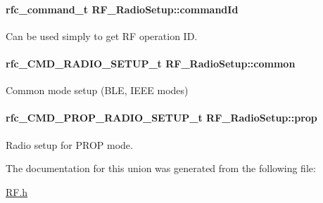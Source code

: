 \paragraph[{command\+Id}]{\setlength{\rightskip}{0pt plus 5cm}rfc\+\_\+command\+\_\+t R\+F\+\_\+\+Radio\+Setup\+::command\+Id}\label{union_r_f___radio_setup_a7849a5bb5dc28c798cc55793f6c347dd}


Can be used simply to get R\+F operation I\+D. 

\paragraph[{common}]{\setlength{\rightskip}{0pt plus 5cm}rfc\+\_\+\+C\+M\+D\+\_\+\+R\+A\+D\+I\+O\+\_\+\+S\+E\+T\+U\+P\+\_\+t R\+F\+\_\+\+Radio\+Setup\+::common}\label{union_r_f___radio_setup_afd03d9690df15d5cca3e82c4ff25ba58}


Common mode setup (B\+L\+E, I\+E\+E\+E modes) 

\paragraph[{prop}]{\setlength{\rightskip}{0pt plus 5cm}rfc\+\_\+\+C\+M\+D\+\_\+\+P\+R\+O\+P\+\_\+\+R\+A\+D\+I\+O\+\_\+\+S\+E\+T\+U\+P\+\_\+t R\+F\+\_\+\+Radio\+Setup\+::prop}\label{union_r_f___radio_setup_afd693ac0735adf77800aa285124bd03a}


Radio setup for P\+R\+O\+P mode. 



The documentation for this union was generated from the following file\+:\begin{DoxyCompactItemize}
\item 
\hyperlink{_r_f_8h}{R\+F.\+h}\end{DoxyCompactItemize}
